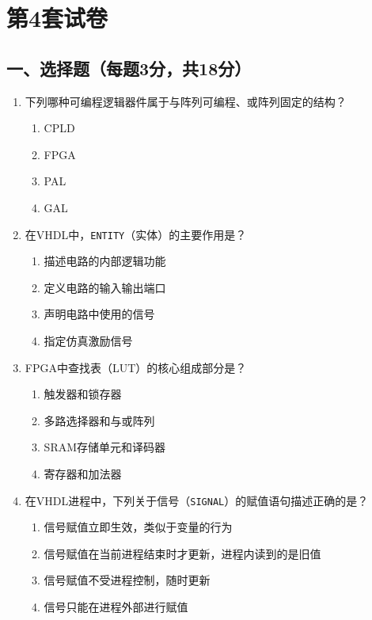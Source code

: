 \chapter{第4套试卷}

\section*{一、选择题（每题3分，共18分）}

\begin{enumerate}[label=\arabic*.]

\item 下列哪种可编程逻辑器件属于与阵列可编程、或阵列固定的结构？
\begin{enumerate}[label=\Alph*.]
  \item CPLD
  \item FPGA
  \item PAL
  \item GAL
\end{enumerate}

\item 在VHDL中，\texttt{ENTITY}（实体）的主要作用是？
\begin{enumerate}[label=\Alph*.]
  \item 描述电路的内部逻辑功能
  \item 定义电路的输入输出端口
  \item 声明电路中使用的信号
  \item 指定仿真激励信号
\end{enumerate}

\item FPGA中查找表（LUT）的核心组成部分是？
\begin{enumerate}[label=\Alph*.]
  \item 触发器和锁存器
  \item 多路选择器和与或阵列
  \item SRAM存储单元和译码器
  \item 寄存器和加法器
\end{enumerate}

\item 在VHDL进程中，下列关于信号（\texttt{SIGNAL}）的赋值语句描述正确的是？
\begin{enumerate}[label=\Alph*.]
  \item 信号赋值立即生效，类似于变量的行为
  \item 信号赋值在当前进程结束时才更新，进程内读到的是旧值
  \item 信号赋值不受进程控制，随时更新
  \item 信号只能在进程外部进行赋值
\end{enumerate}


\end{enumerate}
